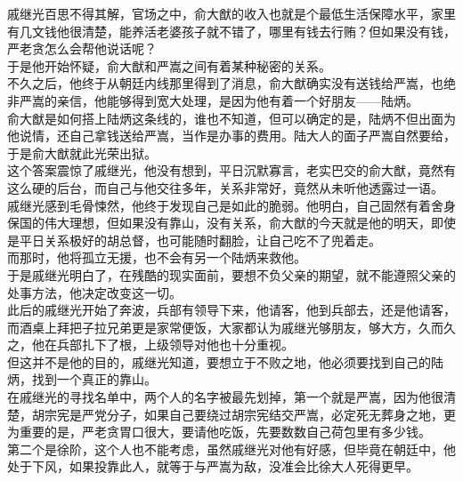 \begin{multicols}{\theparacolNo}
戚继光百思不得其解，官场之中，俞大猷的收入也就是个最低生活保障水平，家里有几文钱他很清楚，能养活老婆孩子就不错了，哪里有钱去行贿？但如果没有钱，严老贪怎么会帮他说话呢？\\

于是他开始怀疑，俞大猷和严嵩之间有着某种秘密的关系。\\

不久之后，他终于从朝廷内线那里得到了消息，俞大猷确实没有送钱给严嵩，也绝非严嵩的亲信，他能够得到宽大处理，是因为他有着一个好朋友——陆炳。\\

俞大猷是如何搭上陆炳这条线的，谁也不知道，但可以确定的是，陆炳不但出面为他说情，还自己拿钱送给严嵩，当作是办事的费用。陆大人的面子严嵩自然要给，于是俞大猷就此光荣出狱。\\

这个答案震惊了戚继光，他没有想到，平日沉默寡言，老实巴交的俞大猷，竟然有这么硬的后台，而自己与他交往多年，关系非常好，竟然从未听他透露过一语。\\

戚继光感到毛骨悚然，他终于发现自己是如此的脆弱。他明白，自己固然有着舍身保国的伟大理想，但如果没有靠山，没有关系，俞大猷的今天就是他的明天，即使是平日关系极好的胡总督，也可能随时翻脸，让自己吃不了兜着走。\\

而那时，他将孤立无援，也不会有另一个陆炳来救他。\\

于是戚继光明白了，在残酷的现实面前，要想不负父亲的期望，就不能遵照父亲的处事方法，他决定改变这一切。\\

此后的戚继光开始了奔波，兵部有领导下来，他请客，他到兵部去，还是他请客，而酒桌上拜把子拉兄弟更是家常便饭，大家都认为戚继光够朋友，够大方，久而久之，他在兵部扎下了根，上级领导对他也十分重视。\\

但这并不是他的目的，戚继光知道，要想立于不败之地，他必须要找到自己的陆炳，找到一个真正的靠山。\\

在戚继光的寻找名单中，两个人的名字被最先划掉，第一个就是严嵩，因为他很清楚，胡宗宪是严党分子，如果自己要绕过胡宗宪结交严嵩，必定死无葬身之地，更为重要的是，严老贪胃口很大，要请他吃饭，先要数数自己荷包里有多少钱。\\

第二个是徐阶，这个人也不能考虑，虽然戚继光对他有好感，但毕竟在朝廷中，他处于下风，如果投靠此人，就等于与严嵩为敌，没准会比徐大人死得更早。\\


\end{multicols}
